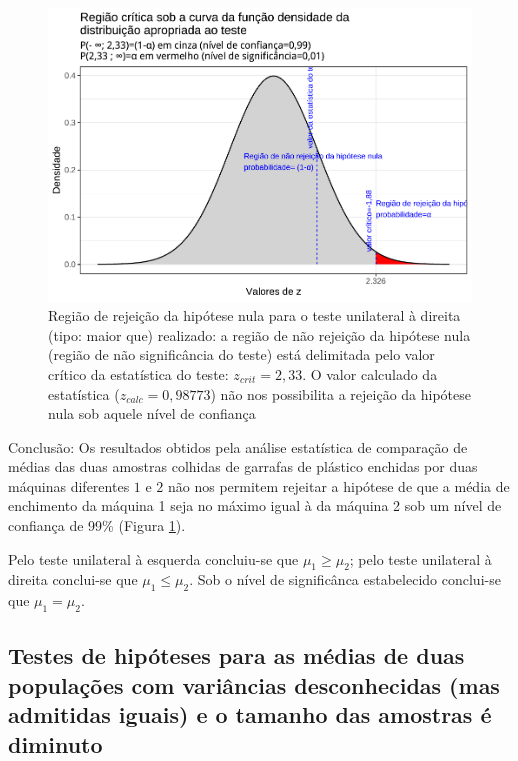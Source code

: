 \documentclass[
]{book}
\begin{document}
\begin{figure}

{\centering \includegraphics[width=1\linewidth]{apostila_files/figure-latex/fig85-1} 

}

\caption{Região de rejeição da hipótese nula para o teste unilateral à direita (tipo: maior que) realizado: a região de não rejeição da hipótese nula (região de não significância do teste) está delimitada pelo valor crítico da estatística do teste: $z_{crit} = 2,33$. O valor calculado da estatística ($z_{calc}=0,98773$) não nos possibilita a rejeição da hipótese nula sob aquele nível de confiança}\label{fig:fig85}
\end{figure}

\hfill\break

Conclusão: Os resultados obtidos pela análise estatística de comparação de médias das duas amostras colhidas de garrafas de plástico enchidas por duas máquinas diferentes \(1\) e \(2\) não nos permitem rejeitar a hipótese de que a média de enchimento da máquina 1 seja no máximo igual à da máquina 2 sob um nível de confiança de 99\% (Figura \ref{fig:fig85}).

\hfill\break

Pelo teste unilateral à esquerda concluiu-se que \(\mu_{1} \ge \mu_{2}\); pelo teste unilateral à direita conclui-se que \(\mu_{1} \le \mu_{2}\). Sob o nível de significânca estabelecido conclui-se que \(\mu_{1} = \mu_{2}\).

\hfill\break

\hypertarget{testes-de-hipuxf3teses-para-as-muxe9dias-de-duas-populauxe7uxf5es-com-variuxe2ncias-desconhecidas-mas-admitidas-iguais-e-o-tamanho-das-amostras-uxe9-diminuto}{%
\subsection{Testes de hipóteses para as médias de duas populações com variâncias desconhecidas (mas admitidas iguais) e o tamanho das amostras é diminuto}\label{testes-de-hipuxf3teses-para-as-muxe9dias-de-duas-populauxe7uxf5es-com-variuxe2ncias-desconhecidas-mas-admitidas-iguais-e-o-tamanho-das-amostras-uxe9-diminuto}}
\end{document}
